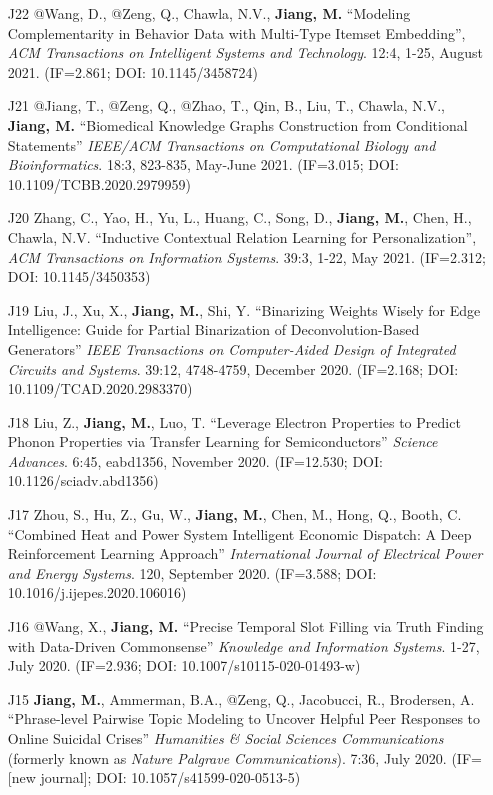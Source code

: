 \documentclass[10pt]{article}
\newenvironment{myindentpar}[1]%
{\begin{list}{}%
         {\setlength{\leftmargin}{#1}}%
         \item[]%
}
{\end{list}}
\newcounter{list}
\begin{document}
\begin{myindentpar}{0.00cm}
\begin{enumerate}[leftmargin=.5cm]
\item[J22] @Wang, D., @Zeng, Q., Chawla, N.V., \textbf{Jiang, M.} ``Modeling Complementarity in Behavior Data with Multi-Type Itemset Embedding'', \textit{ACM Transactions on Intelligent Systems and Technology}. 12:4, 1-25, August 2021. (IF=2.861; DOI: 10.1145/3458724)

\item[J21] @Jiang, T., @Zeng, Q., @Zhao, T., Qin, B., Liu, T., Chawla, N.V., \textbf{Jiang, M.} ``Biomedical Knowledge Graphs Construction from Conditional Statements'' \textit{IEEE/ACM Transactions on Computational Biology and Bioinformatics}. 18:3, 823-835, May-June 2021. (IF=3.015; DOI: 10.1109/TCBB.2020.2979959)

\item[J20] Zhang, C., Yao, H., Yu, L., Huang, C., Song, D., \textbf{Jiang, M.}, Chen, H., Chawla, N.V. ``Inductive Contextual Relation Learning for Personalization'', \textit{ACM Transactions on Information Systems}. 39:3, 1-22, May 2021. (IF=2.312; DOI: 10.1145/3450353)

\item[J19] Liu, J., Xu, X., \textbf{Jiang, M.}, Shi, Y. ``Binarizing Weights Wisely for Edge Intelligence: Guide for Partial Binarization of Deconvolution-Based Generators'' \textit{IEEE Transactions on Computer-Aided Design of Integrated Circuits and Systems}. 39:12, 4748-4759, December 2020. (IF=2.168; DOI: 10.1109/TCAD.2020.2983370)

\item[J18] Liu, Z., \textbf{Jiang, M.}, Luo, T. ``Leverage Electron Properties to Predict Phonon Properties via Transfer Learning for Semiconductors'' \textit{Science Advances}. 6:45, eabd1356, November 2020. (IF=12.530; DOI: 10.1126/sciadv.abd1356)
	
\item[J17] Zhou, S., Hu, Z., Gu, W., \textbf{Jiang, M.}, Chen, M., Hong, Q., Booth, C. ``Combined Heat and Power System Intelligent Economic Dispatch: A Deep Reinforcement Learning Approach'' \textit{International Journal of Electrical Power and Energy Systems}. 120, September 2020. (IF=3.588; DOI: 10.1016/j.ijepes.2020.106016)

\item[J16] @Wang, X., \textbf{Jiang, M.} ``Precise Temporal Slot Filling via Truth Finding with Data-Driven Commonsense'' \textit{Knowledge and Information Systems}. 1-27, July 2020. (IF=2.936; DOI: 10.1007/s10115-020-01493-w)

\item[J15] \textbf{Jiang, M.}, Ammerman, B.A., @Zeng, Q., Jacobucci, R., Brodersen, A. ``Phrase-level Pairwise Topic Modeling to Uncover Helpful Peer Responses to Online Suicidal Crises'' \textit{Humanities \& Social Sciences Communications} (formerly known as \textit{Nature Palgrave Communications}). 7:36, July 2020. (IF=[new journal]; DOI: 10.1057/s41599-020-0513-5)


\end{enumerate}
\end{myindentpar}
\end{document}
